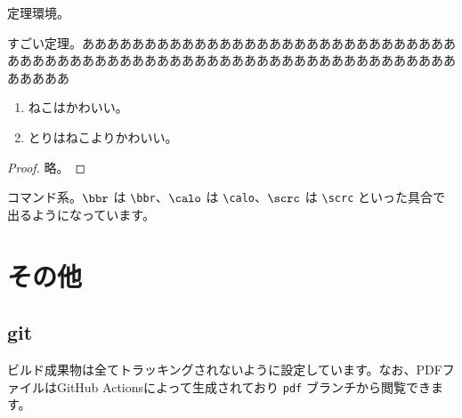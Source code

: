 \documentclass[a4paper]{ltjsarticle}
\begin{document}
定理環境。

\begin{thm}[ねこちゃんの定理]
  すごい定理。あああああああああああああああああああああああああああああああああああああああああああああああああああああああああああああああああああああああ
  \begin{enumerate}
    \item ねこはかわいい。
    \item とりはねこよりかわいい。
  \end{enumerate}
\end{thm}
\begin{proof}
  略。
\end{proof}

コマンド系。$\bbr$ は \texttt{\textbackslash bbr}、$\calo$ は \texttt{\textbackslash calo}、$\scrc$ は \texttt{\textbackslash scrc} といった具合で出るようになっています。


\section{その他}

\subsection{git}
ビルド成果物は全てトラッキングされないように設定しています。なお、PDFファイルはGitHub Actionsによって生成されており \texttt{pdf} ブランチから閲覧できます。
\end{document}
